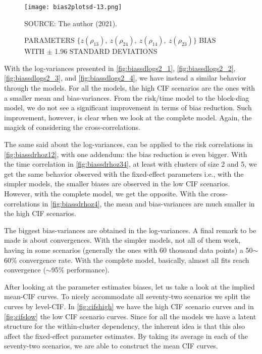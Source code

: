 \begin{figure}[H]
 \setlength{\abovecaptionskip}{.0001pt}
 \caption{PARAMETERS
          \(\{z(\rho_{13}),~z(\rho_{24}),~z(\rho_{14}),~z(\rho_{23})\}\)
          BIAS WITH \(\pm\) 1.96 STANDARD DEVIATIONS}
 \vspace{0.2cm}\centering
 \texttt{[image: bias2plotsd-13.png]}\\
 \begin{footnotesize}
  SOURCE: The author (2021).
 \end{footnotesize}
 \label{fig:biassdrhoz4}
\end{figure}

With the log-variances presented in \autoref{fig:biassdlogs2_1},
\autoref{fig:biassdlogs2_2}, \autoref{fig:biassdlogs2_3}, and
\autoref{fig:biassdlogs2_4}, we have instead a similar behavior through
the models. For all the models, the high CIF scenarios are the ones with
a smaller mean and bias-variances. From the risk/time model to the
block-diag model, we do not see a significant improvement in terms of
bias reduction. Such improvement, however, is clear when we look at the
complete model. Again, the magick of considering the cross-correlations.

The same said about the log-variances, can be applied to the risk
correlations in \autoref{fig:biassdrhoz12}, with one addendum: the bias
reduction is even bigger. With the time correlation in
\autoref{fig:biassdrhoz34}, at least with clusters of size 2 and 5,
we get the same behavior observed with the fixed-effect parameters i.e.,
with the simpler models, the smaller biases are observed in the low CIF
scenarios. However, with the complete model, we get the opposite. With
the cross-correlations in
\autoref{fig:biassdrhoz4}, the mean and bias-variances are much smaller
in the high CIF scenarios.

The biggest bias-variances are obtained in the log-variances. A final
remark to be made is about convergences. With the simpler models, not
all of them work, having in some scenarios (generally the ones with 60
thousand data points) a 50\(\sim\)60\% convergence rate. With the
complete model, basically, almost all fits reach convergence
(\(\sim\)95\% performance).

After looking at the parameter estimates biases, let us take a look at
the implied mean-CIF curves. To nicely accommodate all seventy-two
scenarios we split the curves by level-CIF. In \autoref{fig:cifshigh} we
have the high CIF scenario curves and in \autoref{fig:cifslow} the low
CIF scenario curves. Since for all the models we have a latent structure
for the within-cluster dependency, the inherent idea is that this also
affect the fixed-effect parameter estimates. By taking its average in
each of the seventy-two scenarios, we are able to construct the mean CIF
curves.

